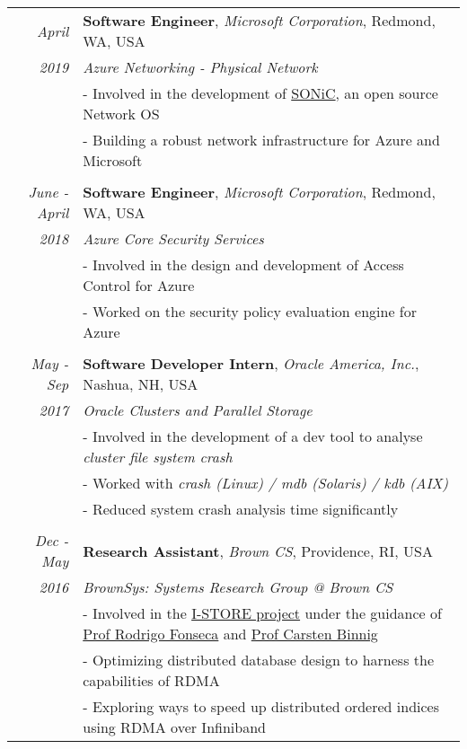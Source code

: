\documentclass[14pt]{article}
\begin{document}
\begin{tabularx}{\textwidth}{r X}
\emph{April} & \textbf{Software Engineer}, \textit{Microsoft Corporation}, Redmond, WA, USA \\
\emph{2019}				& \emph{Azure Networking - Physical Network} \\
					& - Involved in the development of \href{https://azure.github.io/SONiC/}{SONiC}, an open source Network OS \\
					& - Building a robust network infrastructure for Azure and Microsoft \\
\\ 
\emph{June - April} & \textbf{Software Engineer}, \textit{Microsoft Corporation}, Redmond, WA, USA \\
\emph{2018 \enskip \enskip 2019} 	& \emph{Azure Core Security Services} \\
					& - Involved in the design and development of Access Control for Azure \\
					& - Worked on the security policy evaluation engine for Azure \\
\\
\emph{May - Sep} & \textbf{Software Developer Intern}, \textit{Oracle America,
Inc.}, Nashua, NH, USA \\
\emph{2017 \enskip 2017}				 & \emph{Oracle Clusters and Parallel Storage}\\
					 & - Involved in the development of a dev tool to analyse \emph{cluster
					 file system crash} \\
					 & - Worked with \textit{crash (Linux) / mdb (Solaris) / kdb (AIX)} \\
					 & - Reduced system crash analysis time significantly \\
\\ 
\emph{Dec - May} & \textbf{Research Assistant}, \textit{Brown CS}, Providence, RI, USA \\
\emph{2016  \enskip 2018}                & \emph{BrownSys: Systems Research Group @ Brown CS}\\
                                         & - Involved in the \href{http://binnig.name/?page_id=33}{I-STORE project} under the guidance of \href{http://cs.brown.edu/~rfonseca/}{Prof Rodrigo Fonseca} and \href{http://binnig.name}{Prof Carsten Binnig}\\
					 & - Optimizing distributed database design to harness the capabilities of RDMA \\
                                         & - Exploring ways to speed up distributed ordered indices using RDMA over Infiniband \\

\end{tabularx}
\end{document}

